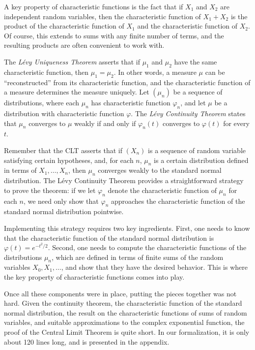 \documentclass{svjour3}
\newcommand{\ph}{\varphi}
\begin{document}
A key property of characteristic functions is the fact that if $X_1$ and $X_2$ are independent random variables, then the characteristic function of $X_1 + X_2$ is the product of the characteristic function of $X_1$ and the characteristic function of $X_2$. Of course, this extends to sums with any finite number of terms, and the resulting products are often convenient to work with. 

The \emph{L\'evy Uniqueness Theorem} asserts that if $\mu_1$ and $\mu_2$ have the same characteristic function, then $\mu_1 = \mu_2$. In other words, a measure $\mu$ can be ``reconstructed'' from its characteristic function, and the characteristic function of a measure determines the measure uniquely.  Let $(\mu_n)$ be a sequence of distributions, where each $\mu_n$ has characteristic function $\ph_n$, and let $\mu$ be a distribution with characteristic function $\ph$. The \emph{L\'evy Continuity Theorem} states that $\mu_n$ converges to $\mu$ weakly if and only if $\ph_n(t)$ converges to $\ph(t)$ for every $t$.

Remember that the CLT asserts that if $(X_n)$ is a sequence of random variable satisfying certain hypotheses, and, for each $n$, $\mu_n$ is a certain distribution defined in terms of $X_1, \ldots, X_n$, then $\mu_n$ converges weakly to the standard normal distribution. The L\'evy Continuity Theorem provides a straightforward strategy to prove the theorem: if we let $\ph_n$ denote the characteristic function of $\mu_n$ for each $n$, we need only show that $\ph_n$ approaches the characteristic function of the standard normal distribution pointwise.

Implementing this strategy requires two key ingredients. First, one needs to know that the characteristic function of the standard normal distribution is $\ph(t) = e^{-t^2/2}$. Second, one needs to compute the characteristic functions of the distributions $\mu_n$, which are defined in terms of finite sums of the random variables $X_0, X_1, \ldots$, and show that they have the desired behavior. This is where the key property of characteristic functions comes into play.

Once all these components were in place, putting the pieces together was not hard. Given the continuity theorem, the characteristic function of the standard normal distribution, the result on the characteristic functions of sums of random variables, and suitable approximations to the complex exponential function, the proof of the Central Limit Theorem is quite short. In our formalization, it is only about 120 lines long, and is presented in the appendix.
\end{document}
